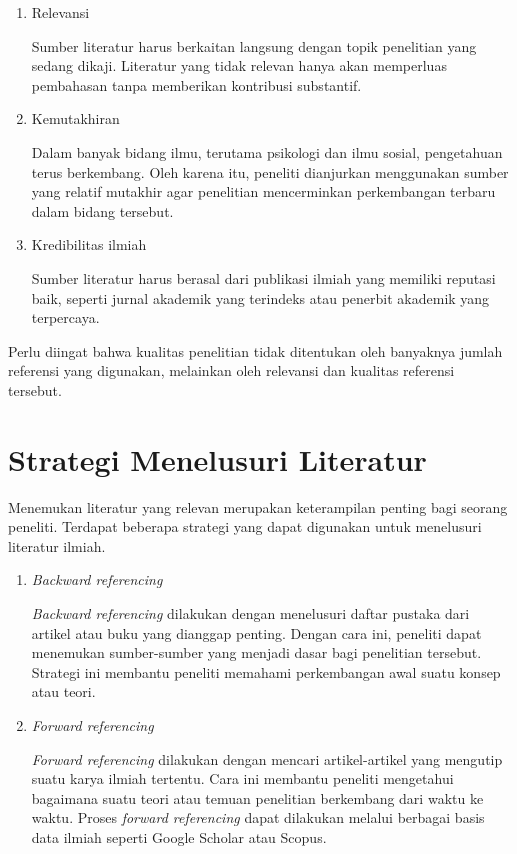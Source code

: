 \documentclass[
  indonesian,
  letterpaper,
  DIV=11,
  numbers=noendperiod]{scrreprt}
\begin{document}
\begin{enumerate}
\def\labelenumi{\arabic{enumi}.}
\item
  Relevansi

  Sumber literatur harus berkaitan langsung dengan topik penelitian yang
  sedang dikaji. Literatur yang tidak relevan hanya akan memperluas
  pembahasan tanpa memberikan kontribusi substantif.
\item
  Kemutakhiran

  Dalam banyak bidang ilmu, terutama psikologi dan ilmu sosial,
  pengetahuan terus berkembang. Oleh karena itu, peneliti dianjurkan
  menggunakan sumber yang relatif mutakhir agar penelitian mencerminkan
  perkembangan terbaru dalam bidang tersebut.
\item
  Kredibilitas ilmiah

  Sumber literatur harus berasal dari publikasi ilmiah yang memiliki
  reputasi baik, seperti jurnal akademik yang terindeks atau penerbit
  akademik yang terpercaya.
\end{enumerate}

Perlu diingat bahwa kualitas penelitian tidak ditentukan oleh banyaknya
jumlah referensi yang digunakan, melainkan oleh relevansi dan kualitas
referensi tersebut.

\section{Strategi Menelusuri
Literatur}\label{strategi-menelusuri-literatur}

Menemukan literatur yang relevan merupakan keterampilan penting bagi
seorang peneliti. Terdapat beberapa strategi yang dapat digunakan untuk
menelusuri literatur ilmiah.

\begin{enumerate}
\def\labelenumi{\arabic{enumi}.}
\item
  \emph{Backward referencing}

  \emph{Backward referencing} dilakukan dengan menelusuri daftar pustaka
  dari artikel atau buku yang dianggap penting. Dengan cara ini,
  peneliti dapat menemukan sumber-sumber yang menjadi dasar bagi
  penelitian tersebut. Strategi ini membantu peneliti memahami
  perkembangan awal suatu konsep atau teori.
\item
  \emph{Forward referencing}

  \emph{Forward referencing} dilakukan dengan mencari artikel-artikel
  yang mengutip suatu karya ilmiah tertentu. Cara ini membantu peneliti
  mengetahui bagaimana suatu teori atau temuan penelitian berkembang
  dari waktu ke waktu. Proses \emph{forward referencing} dapat dilakukan
  melalui berbagai basis data ilmiah seperti Google Scholar atau Scopus.
\end{enumerate}
\end{document}

